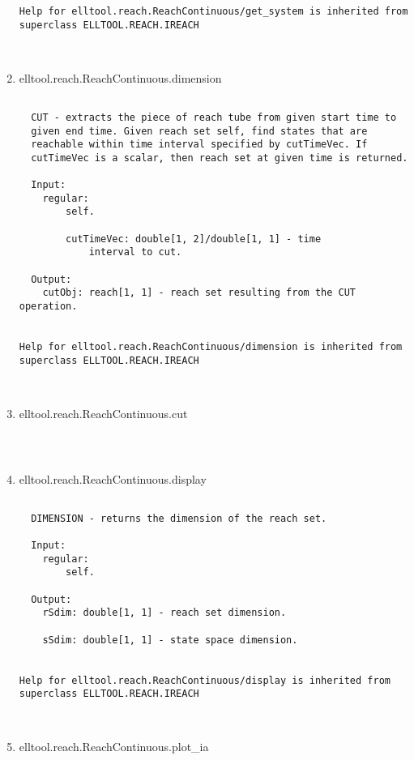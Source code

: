 \begin{enumerate}
\begin{lstlisting}
Help for elltool.reach.ReachContinuous/get_system is inherited from superclass ELLTOOL.REACH.IREACH



\end{lstlisting}
\fontfamily{\familydefault}
\selectfont
\item {elltool.reach.ReachContinuous.dimension}
\selectfont
\begin{lstlisting}

  CUT - extracts the piece of reach tube from given start time to
  given end time. Given reach set self, find states that are
  reachable within time interval specified by cutTimeVec. If
  cutTimeVec is a scalar, then reach set at given time is returned.

  Input:
    regular:
        self.

        cutTimeVec: double[1, 2]/double[1, 1] - time
            interval to cut.

  Output:
    cutObj: reach[1, 1] - reach set resulting from the CUT operation.


Help for elltool.reach.ReachContinuous/dimension is inherited from superclass ELLTOOL.REACH.IREACH



\end{lstlisting}
\fontfamily{\familydefault}
\selectfont
\item {elltool.reach.ReachContinuous.cut}
\selectfont
\begin{lstlisting}



\end{lstlisting}
\fontfamily{\familydefault}
\selectfont
\item {elltool.reach.ReachContinuous.display}
\selectfont
\begin{lstlisting}

  DIMENSION - returns the dimension of the reach set.

  Input:
    regular:
        self.

  Output:
    rSdim: double[1, 1] - reach set dimension.

    sSdim: double[1, 1] - state space dimension.


Help for elltool.reach.ReachContinuous/display is inherited from superclass ELLTOOL.REACH.IREACH



\end{lstlisting}
\fontfamily{\familydefault}
\selectfont
\item {elltool.reach.ReachContinuous.plot\_ia}
\selectfont
\begin{lstlisting}


\end{lstlisting}
\end{enumerate}
